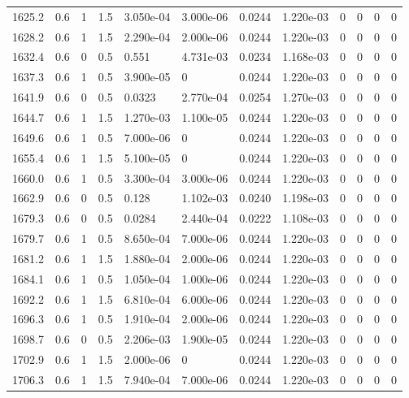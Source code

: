 \documentclass[preview]{standalone}
\begin{document}
{{{{{{{{{{\begin{tabular}{L{1.2cm}C{1.2cm} C{0.3cm}C{0.5cm} C{1.4cm}C{1.4cm} C{1.4cm}C{1.4cm} C{1.6cm}C{1.6cm} C{1.6cm}C{1.6cm}}
  1625.2  &   0.6  & 1     & 1.5 &  3.050e-04  & 3.000e-06  &  0.0244&   1.220e-03& 0 & 0   &  0 & 0  \\ 
  1628.2  &   0.6  & 1     & 1.5 &  2.290e-04  & 2.000e-06  &  0.0244&   1.220e-03& 0 & 0   &  0 & 0  \\ 
  1632.4  &   0.6  & 0     & 0.5 &  0.551  & 4.731e-03  &  0.0234&   1.168e-03& 0 & 0   &  0 & 0  \\ 
  1637.3  &   0.6  & 1     & 0.5 &  3.900e-05  & 0  &  0.0244&   1.220e-03& 0 & 0   &  0 & 0  \\ 
  1641.9  &   0.6  & 0     & 0.5 &  0.0323  & 2.770e-04  &  0.0254&   1.270e-03& 0 & 0   &  0 & 0  \\ 
  1644.7  &   0.6  & 1     & 1.5 &  1.270e-03  & 1.100e-05  &  0.0244&   1.220e-03& 0 & 0   &  0 & 0  \\ 
  1649.6  &   0.6  & 1     & 0.5 &  7.000e-06  & 0  &  0.0244&   1.220e-03& 0 & 0   &  0 & 0  \\ 
  1655.4  &   0.6  & 1     & 1.5 &  5.100e-05  & 0  &  0.0244&   1.220e-03& 0 & 0   &  0 & 0  \\ 
  1660.0  &   0.6  & 1     & 0.5 &  3.300e-04  & 3.000e-06  &  0.0244&   1.220e-03& 0 & 0   &  0 & 0  \\ 
  1662.9  &   0.6  & 0     & 0.5 &  0.128  & 1.102e-03  &  0.0240&   1.198e-03& 0 & 0   &  0 & 0  \\ 
  1679.3  &   0.6  & 0     & 0.5 &  0.0284  & 2.440e-04  &  0.0222&   1.108e-03& 0 & 0   &  0 & 0  \\ 
  1679.7  &   0.6  & 1     & 0.5 &  8.650e-04  & 7.000e-06  &  0.0244&   1.220e-03& 0 & 0   &  0 & 0  \\ 
  1681.2  &   0.6  & 1     & 1.5 &  1.880e-04  & 2.000e-06  &  0.0244&   1.220e-03& 0 & 0   &  0 & 0  \\ 
  1684.1  &   0.6  & 1     & 0.5 &  1.050e-04  & 1.000e-06  &  0.0244&   1.220e-03& 0 & 0   &  0 & 0  \\ 
  1692.2  &   0.6  & 1     & 1.5 &  6.810e-04  & 6.000e-06  &  0.0244&   1.220e-03& 0 & 0   &  0 & 0  \\ 
  1696.3  &   0.6  & 1     & 0.5 &  1.910e-04  & 2.000e-06  &  0.0244&   1.220e-03& 0 & 0   &  0 & 0  \\ 
  1698.7  &   0.6  & 0     & 0.5 &  2.206e-03  & 1.900e-05  &  0.0244&   1.220e-03& 0 & 0   &  0 & 0  \\ 
  1702.9  &   0.6  & 1     & 1.5 &  2.000e-06  & 0  &  0.0244&   1.220e-03& 0 & 0   &  0 & 0  \\ 
  1706.3  &   0.6  & 1     & 1.5 &  7.940e-04  & 7.000e-06  &  0.0244&   1.220e-03& 0 & 0   &  0 & 0  \\ 

\end{tabular}}}}}}}}}}}
\end{document}
